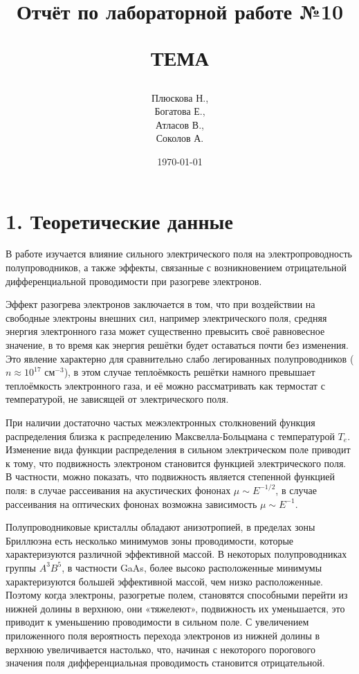 \documentclass[a4paper,12pt]{report}
\title{Отчёт по лабораторной работе №10

ТЕМА}
\author{Плюскова Н., \\
Богатова Е., \\
Атласов В., \\
Соколов А.}
\date{\today}
\begin{document}
\maketitle


\section*{1. Теоретические данные}

В работе изучается влияние сильного электрического поля на электропроводность полупроводников, а также эффекты, связанные с возникновением отрицательной дифференциальной проводимости при разогреве электронов.

Эффект разогрева электронов заключается в том, что при воздействии на свободные электроны внешних сил, например электрического поля, средняя энергия электронного газа может существенно превысить своё равновесное значение, в то время как энергия решётки будет оставаться почти без изменения. Это явление характерно для сравнительно слабо легированных полупроводников ($n \approx 10^{17}$ см$^{-3}$), в этом случае теплоёмкость решётки намного превышает теплоёмкость электронного газа, и её можно рассматривать как термостат с температурой, не зависящей от электрического поля.

При наличии достаточно частых межэлектронных столкновений функция распределения близка к распределению Максвелла-Больцмана с температурой $T_{e}$. Изменение вида функции распределения в сильном электрическом поле приводит к тому, что подвижность электроном становится функцией электрического поля. В частности, можно показать, что подвижность является степенной функцией поля: в случае рассеивания на акустических фононах $\mu \sim E^{-1/2}$, в случае рассеивания на оптических фононах возможна зависимость $\mu \sim E^{-1}$.

Полупроводниковые кристаллы обладают анизотропией, в пределах зоны Бриллюэна есть несколько минимумов зоны проводимости, которые характеризуются различной эффективной массой. В некоторых полупроводниках группы $A^{3}B^{5}$, в частности GaAs, более высоко расположенные минимумы характеризуются большей эффективной массой, чем низко расположенные. Поэтому когда электроны, разогретые полем, становятся способными перейти из нижней долины в верхнюю, они «тяжелеют», подвижность их уменьшается, это приводит к уменьшению проводимости в сильном поле. С увеличением приложенного
поля вероятность перехода электронов из нижней долины в верхнюю увеличивается настолько, что, начиная с некоторого порогового значения поля дифференциальная проводимость становится отрицательной.
\end{document}
